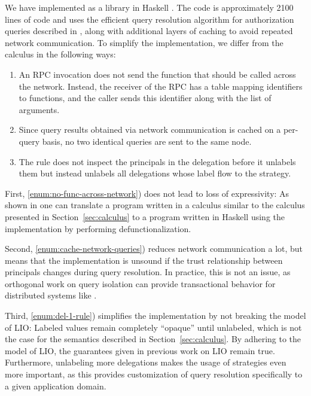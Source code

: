 We have implemented \lang{} as a library in Haskell \cite{flamiolib}. The code is approximately 2100 lines of code and uses the efficient query resolution algorithm for authorization queries described in \cite{Arden:2015:FA:2859845.2859998}, along with additional layers of caching to avoid repeated network communication. To simplify the implementation, we differ from the calculus in the following ways:
\begin{enumerate}
    \item \label{enum:no-func-across-network} An RPC invocation does not send the function that should be called across the network. Instead, the receiver of the RPC has a table mapping identifiers to functions, and the caller sends this identifier along with the list of arguments.
    \item \label{enum:cache-network-queries} Since query results obtained via network communication is cached on a per-query basis, no two identical queries are sent to the same node.
    \item \label{enum:del-1-rule} The  rule does not inspect the principals in the delegation before it unlabels them but instead unlabels all delegations whose label flow to the strategy.
\end{enumerate}

First, \ref{enum:no-func-across-network}) does not lead to loss of expressivity: As shown in \cite{Cooper:2009:RC:1599410.1599439} one can translate a program written in a calculus similar to the calculus presented in Section~\ref{sec:calculus} to a program written in Haskell using the \lang{} implementation by performing defunctionalization.

Second, \ref{enum:cache-network-queries}) reduces network communication a lot, but means that the implementation is unsound if the trust relationship between principals changes during query resolution. In practice, this is not an issue, as orthogonal work on query isolation \cite{Liu:2009:FPS:1629575.1629606} can provide transactional behavior for distributed systems like \lang.

Third, \ref{enum:del-1-rule}) simplifies the implementation by not breaking the model of LIO: Labeled values remain completely ``opaque'' until unlabeled, which is not the case for the semantics described in Section~\ref{sec:calculus}. By adhering to the model of LIO, the guarantees given in previous work on LIO \cite{SRMMlio} remain true. Furthermore, unlabeling more delegations makes the usage of strategies even more important, as this provides customization of query resolution specifically to a given application domain.

